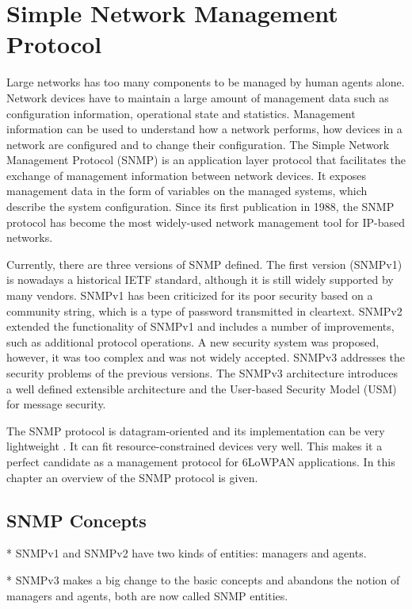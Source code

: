 \chapter{Simple Network Management Protocol}\label{ch:snmp}
Large networks has too many components to be managed by human agents alone. Network devices have to maintain a large amount of management data such as configuration information,  operational state and statistics. Management information can be used to understand how a network performs, how devices in a network are configured and to change their configuration. The Simple Network Management Protocol (SNMP) \cite{rfc3410} is an application layer protocol that facilitates the exchange of management information between network devices. It exposes management data in the form of variables on the managed systems, which describe the system configuration. Since its first publication in 1988, the SNMP protocol has become the most widely-used network management tool for IP-based networks.

Currently, there are three versions of SNMP defined. The first version (SNMPv1) is nowadays a historical IETF standard, although it is still widely supported by many vendors. SNMPv1 has been criticized for its poor security based on a community string, which is a type of password transmitted in cleartext. SNMPv2 extended the functionality of SNMPv1 and includes a number of improvements, such as additional protocol operations. A new security system was proposed, however, it was too complex and was not widely accepted. SNMPv3 addresses the security problems of the previous versions. The SNMPv3 architecture introduces a well defined extensible architecture and the User-based Security Model (USM) for message security.

The SNMP protocol is datagram-oriented and its implementation can be very lightweight \cite{draft-6lowpan-snmp}. It can fit resource-constrained devices very well. This makes it a perfect candidate as a management protocol for 6LoWPAN applications. In this chapter an overview of the SNMP protocol is given.

\section{SNMP Concepts}
* SNMPv1 and SNMPv2 have two kinds of entities: managers and agents.

* SNMPv3 makes a big change to the basic concepts and abandons the notion of managers and agents, both are now called SNMP entities. 

